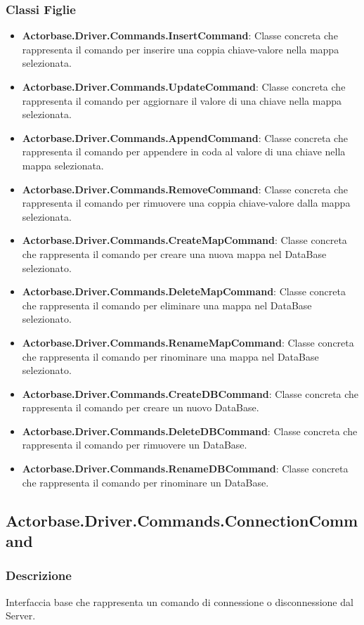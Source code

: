 \documentclass[a4paper]{article}
\begin{document}
			\subsubsection{Classi Figlie}
				\begin{itemize}
					\item \textbf{Actorbase.Driver.Commands.InsertCommand}:
						Classe concreta che rappresenta il comando per inserire una coppia chiave-valore nella mappa selezionata.
					\item \textbf{Actorbase.Driver.Commands.UpdateCommand}:
						Classe concreta che rappresenta il comando per aggiornare il valore di una chiave nella mappa selezionata.
					\item \textbf{Actorbase.Driver.Commands.AppendCommand}:
						Classe concreta che rappresenta il comando per appendere in coda al valore di una chiave nella mappa selezionata.
					\item \textbf{Actorbase.Driver.Commands.RemoveCommand}:
						Classe concreta che rappresenta il comando per rimuovere una coppia chiave-valore dalla mappa selezionata.
					\item \textbf{Actorbase.Driver.Commands.CreateMapCommand}:
						Classe concreta che rappresenta il comando per creare una nuova mappa nel DataBase selezionato.
					\item \textbf{Actorbase.Driver.Commands.DeleteMapCommand}:
						Classe concreta che rappresenta il comando per eliminare una mappa nel DataBase selezionato.
					\item \textbf{Actorbase.Driver.Commands.RenameMapCommand}:
						Classe concreta che rappresenta il comando per rinominare una mappa nel DataBase selezionato.
					\item \textbf{Actorbase.Driver.Commands.CreateDBCommand}:
						Classe concreta che rappresenta il comando per creare un nuovo DataBase.
					\item \textbf{Actorbase.Driver.Commands.DeleteDBCommand}:
						Classe concreta che rappresenta il comando per rimuovere un DataBase.
					\item \textbf{Actorbase.Driver.Commands.RenameDBCommand}:
						Classe concreta che rappresenta il comando per rinominare un DataBase.
				\end{itemize}

		
		\subsection{Actorbase.Driver.Commands.ConnectionCommand}
			\subsubsection{Descrizione} Interfaccia base che rappresenta un comando di connessione o disconnessione dal Server.
\end{document}
